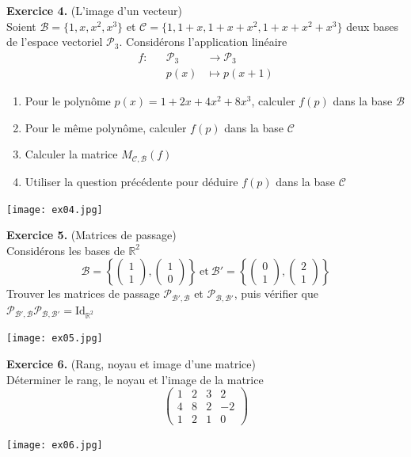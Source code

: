 \documentclass[a4paper, 10pt]{report}
\begin{document}
	\noindent
	\textbf{Exercice 4.} (L'image d'un vecteur)\\
	Soient $\mathcal{B} = \{1, x, x^2, x^3\}$ et
	$\mathcal{C} = \{1, 1 + x, 1 + x + x^2, 1 + x + x^2 + x^3\}$ deux
	bases de l'espace vectoriel $\mathcal{P}_3$. Considérons
	l'application linéaire
	\[\begin{aligned}
		f :&& \mathcal{P}_3 &\to \mathcal{P}_3\\
		&& p(x) &\mapsto p(x + 1)
	\end{aligned}\]
	\begin{enumerate}[label=\arabic*.]
		\item Pour le polynôme $p(x) = 1 + 2x + 4x^2 + 8x^3$, calculer
		$f(p)$ dans la base $\mathcal{B}$
		\item Pour le même polynôme, calculer $f(p)$ dans la base
		$\mathcal{C}$
		\item Calculer la matrice $M_{\mathcal{C,B}}(f)$
		\item Utiliser la question précédente pour déduire $f(p)$ dans
		la base $\mathcal{C}$
	\end{enumerate}
	
	\texttt{[image: ex04.jpg]}
	
	\newpage
	
	\noindent
	\textbf{Exercice 5.} (Matrices de passage)\\
	Considérons les bases de $\mathbb{R}^2$
	\[
		\mathcal{B} = 
			\left\{
			\begin{pmatrix} 1\\1 \end{pmatrix},
			\begin{pmatrix} 1\\0 \end{pmatrix}
			\right\}
		\ \text{et}\ \mathcal{B'} =
			\left\{
			\begin{pmatrix} 0\\1 \end{pmatrix},
			\begin{pmatrix} 2\\1 \end{pmatrix}
			\right\}
	\]
	Trouver les matrices de passage $\mathcal{P_{B', B}}$ et
	$\mathcal{P_{B, B'}}$, puis vérifier que
	$\mathcal{P_{B', B}} \mathcal{P_{B, B'}} 
		= \mathrm{Id}_{\mathbb{R}^2}$
	
	\texttt{[image: ex05.jpg]}
	
	\vspace{5mm}
	\noindent
	\textbf{Exercice 6.} (Rang, noyau et image d'une matrice)\\
	Déterminer le rang, le noyau et l'image de la matrice
	\[\begin{pmatrix}
		1 & 2 & 3 & 2\\
		4 & 8 & 2 & -2\\
		1 & 2 & 1 & 0
	\end{pmatrix}\]
	
	\texttt{[image: ex06.jpg]}
	
	
%	
%	
	
\end{document}
